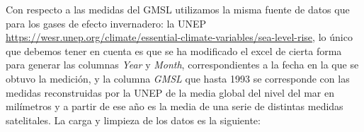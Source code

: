 \documentclass[12pt,a4paper,]{book}
\newenvironment{Shaded}{\begin{snugshade}}{\end{snugshade}}
\newcommand{\AttributeTok}[1]{\textcolor[rgb]{0.13,0.29,0.53}{#1}}
\newcommand{\CommentTok}[1]{\textcolor[rgb]{0.56,0.35,0.01}{\textit{#1}}}
\newcommand{\ConstantTok}[1]{\textcolor[rgb]{0.56,0.35,0.01}{#1}}
\newcommand{\DecValTok}[1]{\textcolor[rgb]{0.00,0.00,0.81}{#1}}
\newcommand{\FunctionTok}[1]{\textcolor[rgb]{0.13,0.29,0.53}{\textbf{#1}}}
\newcommand{\NormalTok}[1]{#1}
\newcommand{\OtherTok}[1]{\textcolor[rgb]{0.56,0.35,0.01}{#1}}
\newcommand{\SpecialCharTok}[1]{\textcolor[rgb]{0.81,0.36,0.00}{\textbf{#1}}}
\newcommand{\StringTok}[1]{\textcolor[rgb]{0.31,0.60,0.02}{#1}}
\numberwithin{dummy}{section}
\theoremstyle{ocrenumbox}
\theoremstyle{blacknumex}
\theoremstyle{blacknumbox}
\theoremstyle{ocrenum}
\theoremstyle{ocrenum}
\begin{document}
Con respecto a las medidas del GMSL utilizamos la misma fuente de datos
que para los gases de efecto invernadero: la UNEP
\url{https://wesr.unep.org/climate/essential-climate-variables/sea-level-rise},
lo único que debemos tener en cuenta es que se ha modificado el excel de
cierta forma para generar las columnas \emph{Year} y \emph{Month},
correspondientes a la fecha en la que se obtuvo la medición, y la
columna \emph{GMSL} que hasta 1993 se corresponde con las medidas
reconstruidas por la UNEP de la media global del nivel del mar en
milímetros y a partir de ese año es la media de una serie de distintas
medidas satelitales. La carga y limpieza de los datos es la siguiente:

\begin{Shaded}
\end{Shaded}
\end{document}
